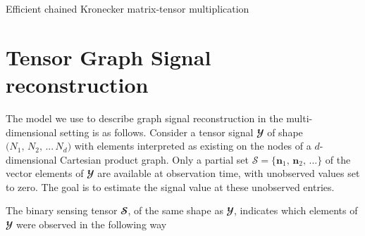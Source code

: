 \begin{algorithm}[t]
    \hypertarget{KronMatMul}{}
    \label{al:KronMatMul}
    \caption{Efficient chained Kronecker matrix-tensor multiplication}
    \begin{algorithmic}
    \vspace{0.25cm}
    \vspace{0.25cm}
    \vspace{0.5cm}
    \vspace{0.25cm}
    \vspace{0.25cm}
    \vspace{0.25cm}
    \vspace{0.25cm}
    \EndFor
    \vspace{0.25cm}
    \vspace{0.25cm}
    \EndFunction
    \vspace{0.25cm}
    \end{algorithmic}
\end{algorithm}

\section{Tensor Graph Signal reconstruction}

The model we use to describe graph signal reconstruction in the multi-dimensional setting is as follows. Consider a tensor signal $\mathbfcal{Y}$ of shape $\big(N_1, \, N_2, \, ... \, N_d \big)$ with elements interpreted as existing on the nodes of a $d$-dimensional Cartesian product graph. Only a partial set $\mathcal{S} = \{\mathbf{n}_1, \, \mathbf{n}_2, \, ... \}$ of the vector elements of $\mathbfcal{Y}$ are available at observation time, with unobserved values set to zero. The goal is to estimate the signal value at these unobserved entries. 

The binary sensing tensor $\mathbfcal{S}$, of the same shape as $\mathbfcal{Y}$, indicates which elements of $\mathbfcal{Y}$ were observed in the following way 

